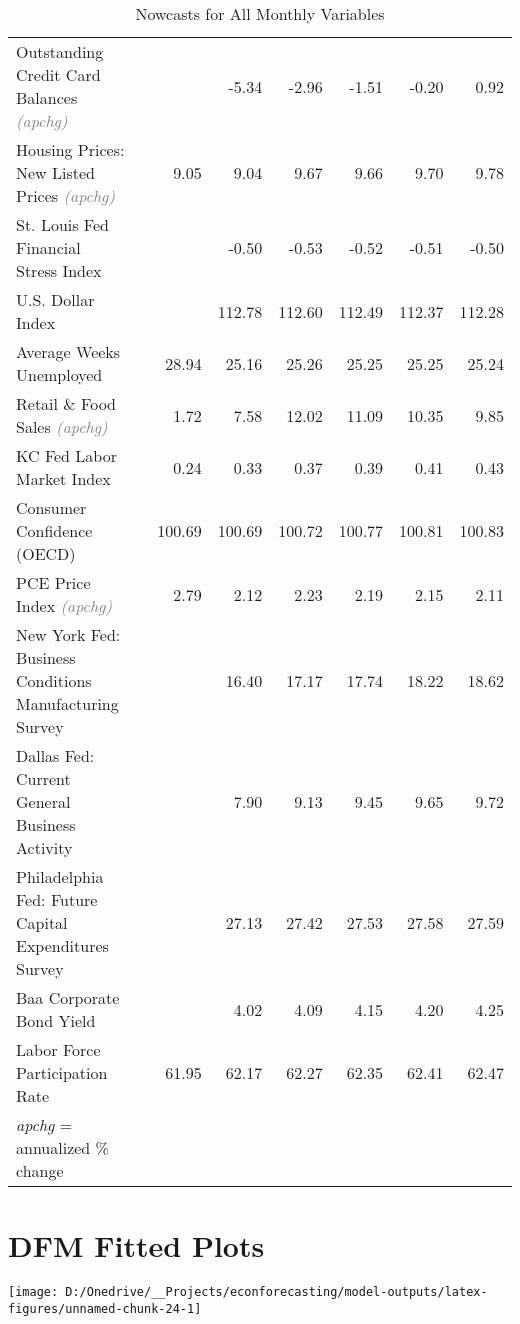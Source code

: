 \documentclass[11pt, letterpaper]{article}\usepackage[]{graphicx}\usepackage[]{color}
\begin{document}
\begin{table}[H]
\begin{tabular}{lrrrrrrr}
  Outstanding Credit Card Balances \textit{\footnotesize\textcolor{gray}{(apchg)}} &  &  & -5.34 & -2.96 & -1.51 & -0.20 & 0.92 \\ 
  Housing Prices: New Listed Prices \textit{\footnotesize\textcolor{gray}{(apchg)}} &  & 9.05 & 9.04 & 9.67 & 9.66 & 9.70 & 9.78 \\ 
  St. Louis Fed Financial Stress Index &  &  & -0.50 & -0.53 & -0.52 & -0.51 & -0.50 \\ 
  U.S. Dollar Index &  &  & 112.78 & 112.60 & 112.49 & 112.37 & 112.28 \\ 
  Average Weeks Unemployed &  & 28.94 & 25.16 & 25.26 & 25.25 & 25.25 & 25.24 \\ 
  Retail \& Food Sales \textit{\footnotesize\textcolor{gray}{(apchg)}} &  & 1.72 & 7.58 & 12.02 & 11.09 & 10.35 & 9.85 \\ 
  KC Fed Labor Market Index &  & 0.24 & 0.33 & 0.37 & 0.39 & 0.41 & 0.43 \\ 
  Consumer Confidence (OECD) &  & 100.69 & 100.69 & 100.72 & 100.77 & 100.81 & 100.83 \\ 
  PCE Price Index \textit{\footnotesize\textcolor{gray}{(apchg)}} &  & 2.79 & 2.12 & 2.23 & 2.19 & 2.15 & 2.11 \\ 
  New York Fed: Business Conditions Manufacturing Survey &  &  & 16.40 & 17.17 & 17.74 & 18.22 & 18.62 \\ 
  Dallas Fed: Current General Business Activity &  &  & 7.90 & 9.13 & 9.45 & 9.65 & 9.72 \\ 
  Philadelphia Fed: Future Capital Expenditures Survey &  &  & 27.13 & 27.42 & 27.53 & 27.58 & 27.59 \\ 
  Baa Corporate Bond Yield &  &  & 4.02 & 4.09 & 4.15 & 4.20 & 4.25 \\ 
  Labor Force Participation Rate &  & 61.95 & 62.17 & 62.27 & 62.35 & 62.41 & 62.47 \\ 
   \hline 
 \textit{apchg} = annualized \% change 
\end{tabular}
\endgroup
\caption{Nowcasts for All Monthly Variables} 
\end{table}



\appendix
\appendixpage
\addappheadtotoc

\section{DFM Fitted Plots}


{\centering \texttt{[image: D:/Onedrive/\_\_Projects/econforecasting/model-outputs/latex-figures/unnamed-chunk-24-1]} 

}
\end{document}
